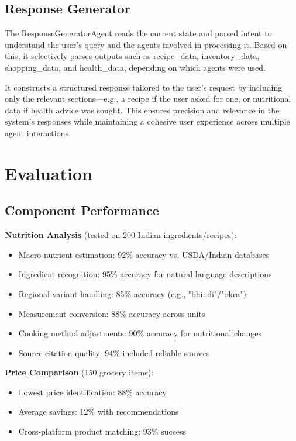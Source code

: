 \documentclass{ecai}
\begin{document}
\subsection{Response Generator}

The ResponseGeneratorAgent reads the current state and parsed intent to understand the user's query and the agents involved in processing it. Based on this, it selectively parses outputs such as recipe\_data, inventory\_data, shopping\_data, and health\_data, depending on which agents were used.

It constructs a structured response tailored to the user's request by including only the relevant sections—e.g., a recipe if the user asked for one, or nutritional data if health advice was sought. This ensures precision and relevance in the system's responses while maintaining a cohesive user experience across multiple agent interactions.

\section{Evaluation}

\subsection{Component Performance}

\textbf{Nutrition Analysis} (tested on 200 Indian ingredients/recipes):
\begin{itemize}[noitemsep,topsep=0pt]
    \item Macro-nutrient estimation: 92\% accuracy vs. USDA/Indian databases
    \item Ingredient recognition: 95\% accuracy for natural language descriptions
    \item Regional variant handling: 85\% accuracy (e.g., "bhindi"/"okra")
    \item Measurement conversion: 88\% accuracy across units
    \item Cooking method adjustments: 90\% accuracy for nutritional changes
    \item Source citation quality: 94\% included reliable sources
\end{itemize}

\textbf{Price Comparison} (150 grocery items):
\begin{itemize}[noitemsep,topsep=0pt]
    \item Lowest price identification: 88\% accuracy
    \item Average savings: 12\% with recommendations
    \item Cross-platform product matching: 93\% success
\end{itemize}
\end{document}
